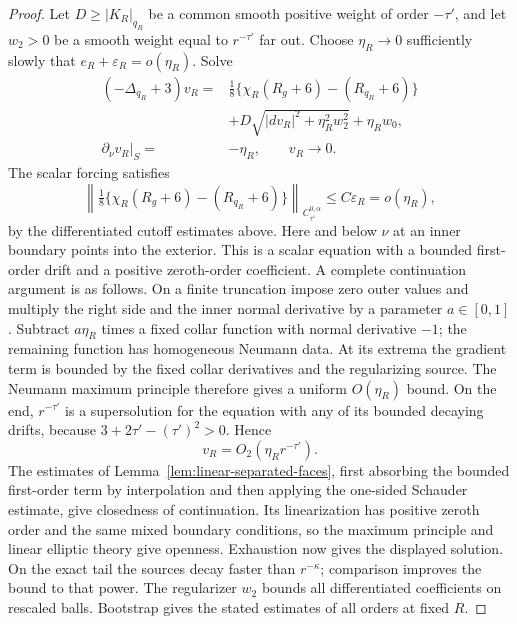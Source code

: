 \begin{proof}
Let \(D\ge |K_R|_{q_R}\) be a common smooth positive weight of order
\(-\tau'\), and let \(w_2>0\) be a smooth weight equal to \(r^{-\tau'}\)
far out.  Choose \(\eta_R\to0\) sufficiently slowly that
\(e_R+\varepsilon_R=o(\eta_R)\).  Solve
\begin{equation}\label{eq:ah-conformal-corrector}
 \begin{split}
 (-\Delta_{q_R}+3)v_R={}&
 \frac18\{\chi_R(R_g+6)-(R_{q_R}+6)\}\\
 &+D\sqrt{|dv_R|^2+\eta_R^2w_2^2}+\eta_Rw_0,\\
 \partial_\nu v_R|_S={}&-\eta_R,\qquad v_R\longrightarrow0 .
 \end{split}
\end{equation}
The scalar forcing satisfies
\[
 \left\|\tfrac18\{\chi_R(R_g+6)-(R_{q_R}+6)\}\right\|_{C^{0,\alpha}_{\tau'}}
 \le C\varepsilon_R=o(\eta_R),
\]
by the differentiated cutoff estimates above.
Here and below \(\nu\) at an inner boundary points into the exterior.
This is a scalar equation with a bounded first-order drift and a
positive zeroth-order coefficient.  A complete continuation argument
is as follows.  On a finite truncation impose zero outer values and
multiply the right side and the inner normal derivative by a
parameter \(a\in[0,1]\). Subtract \(a\eta_R\) times a fixed collar
function with normal derivative \(-1\); the remaining function has
homogeneous Neumann data.  At its extrema the gradient term is
bounded by the fixed collar derivatives and the regularizing
source.  The Neumann maximum principle therefore gives a uniform
\(O(\eta_R)\) bound.  On the end, \(r^{-\tau'}\) is a supersolution
for the equation with any of its bounded decaying drifts, because
\(3+2\tau'-(\tau')^2>0\).  Hence
\[
 v_R=O_2(\eta_Rr^{-\tau'}).
\]
The estimates of Lemma~\ref{lem:linear-separated-faces}, first
absorbing the bounded first-order term by interpolation and then
applying the one-sided Schauder estimate, give closedness
of continuation.  Its linearization has positive zeroth order and
the same mixed boundary conditions, so the maximum principle and
linear elliptic theory give openness.  Exhaustion now gives the
displayed solution.  On the exact tail the sources decay faster
than \(r^{-\kappa}\); comparison improves the bound to that power.
The regularizer \(w_2\) bounds all differentiated coefficients on
rescaled balls.  Bootstrap gives the stated estimates of all
orders at fixed \(R\).


\end{proof}
